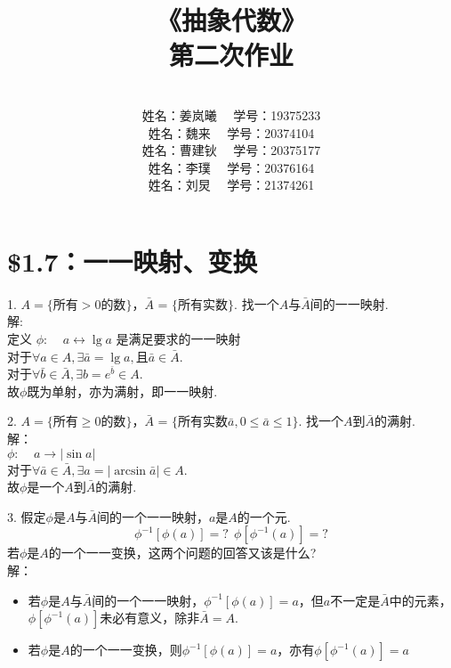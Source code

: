 \documentclass{ctexart}
\title{《抽象代数》\\ 第二次作业}
\author{\\姓名：姜岚曦 \ \ 学号：19375233
		\\姓名：魏来   \ \ 学号：20374104         
	    \\姓名：曹建钬 \ \ 学号：20375177
        \\姓名：李璞   \ \ 学号：20376164
        \\姓名：刘炅   \ \ 学号：21374261}
\date{}
\begin{document}
\pagestyle{empty}
\thispagestyle{empty}
\maketitle
\clearpage	
	
\section*{\$1.7：一一映射、变换}
1. $A = \{$所有$>0$的数$\}$，$\bar{A}$ = $\{$所有实数$\}$. 找一个$A$与$\bar{A}$间的一一映射.\\
解: \\
定义 $\phi: \ \ \ \ \ a \leftrightarrow \lg{a}$
是满足要求的一一映射 \\
对于$\forall a \in A, \exists \bar{a} = \lg a,$且$\bar{a} \in \bar{A}$. \\
对于$\forall \bar{b} \in \bar{A}, \exists b = e^{\bar{b}} \in A$.\\
故$\phi$既为单射，亦为满射，即一一映射.

2. $A = \{$所有$\geq0$的数$\}$，$\bar{A}$ = $\{$所有实数$\bar{a}, 0 \leq \bar{a} \leq 1\}$. 找一个$A$到$\bar{A}$的满射. \\
解：\\
$\phi: \ \ \ \ \ a \rightarrow |\sin a|$ \\
对于$\forall \bar{a} \in \bar{A}, \exists a = |\arcsin \bar{a}| \in A.$ \\
故$\phi$是一个$A$到$\bar{A}$的满射.

3. 假定$\phi$是$A$与$\bar{A}$间的一个一一映射，$a$是$A$的一个元.
\begin{equation*}
	\phi^{-1}[\phi(a)] = ? \ \ \phi[\phi^{-1}(a)] = ?
\end{equation*}
若$\phi$是$A$的一个一一变换，这两个问题的回答又该是什么? \\
解：\\
\begin{itemize}
	\item 若$\phi$是$A$与$\bar{A}$间的一个一一映射，$\phi^{-1}[\phi(a)] = a$，但$a$不一定是$\bar{A}$中的元素，$\phi[\phi^{-1}(a)]$未必有意义，除非$\bar{A}=A$.
	\item 若$\phi$是$A$的一个一一变换，则$	\phi^{-1}[\phi(a)] = a $，亦有$\phi[\phi^{-1}(a)] = a$
\end{itemize}
\end{document}

